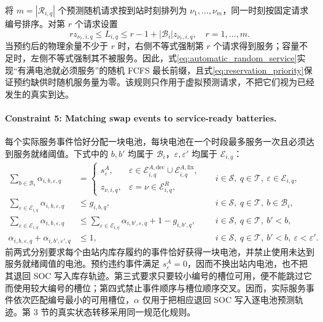 \documentclass[12pt,a4paper,UTF8]{ctexart}
\begin{document}
将 $m=|\mathcal R_{i,q}|$ 个预测随机请求按到站时刻排列为 $\nu_1,\ldots,\nu_m$，同一时刻按固定请求编号排序。对第 $r$ 个请求设置
\begin{equation}
rz_{\nu_r,i,q}
\le L_{i,q}
\le r-1+|\mathcal B_i|z_{\nu_r,i,q},
\quad r=1,\ldots,m.
\label{eq:automatic_random_service}
\end{equation}
当预约后的物理余量不少于 $r$ 时，右侧不等式强制第 $r$ 个请求得到服务；容量不足时，左侧不等式强制其不被服务。因此，式\eqref{eq:automatic_random_service}实现“有满电池就必须服务”的随机 FCFS 最长前缀，且式\eqref{eq:reservation_priority}保证预约缺供时随机服务量为零。该规则只作用于虚拟预测请求，不把它们视为已经发生的真实到达。

\paragraph{Constraint 5: Matching swap events to service-ready batteries.}
每个实际服务事件恰好分配一块电池，每块电池在一个时段最多服务一次且必须达到服务就绪阈值。下式中的 $b,b'$ 均属于 $\mathcal B_i$，$\varepsilon,\varepsilon'$ 均属于 $\mathcal E_{i,q}$：
\begin{subequations}
\label{eq:battery_event_assignment}
\begin{align}
\sum_{b\in\mathcal B_i}\alpha_{i,b,\varepsilon,q}
&=
\begin{cases}
s_\varepsilon^A,
&\varepsilon\in\mathcal E_{i,q}^{A,\mathrm{dec}}\cup
\mathcal E_{i,q}^{A,\mathrm{fix}},\\
z_{\nu,i,q},
&\varepsilon=\nu\in\mathcal E_{i,q}^{R},
\end{cases}
&&i\in\mathcal S,\ q\in\mathcal T,\ \varepsilon\in\mathcal E_{i,q},\\
\sum_{\varepsilon\in\mathcal E_{i,q}}\alpha_{i,b,\varepsilon,q}
&\le g_{i,b,q},
&&i\in\mathcal S,\ q\in\mathcal T,\ b\in\mathcal B_i,\\
\sum_{\varepsilon\in\mathcal E_{i,q}}\alpha_{i,b,\varepsilon,q}
&\le
\sum_{\varepsilon\in\mathcal E_{i,q}}\alpha_{i,b',\varepsilon,q}
+1-g_{i,b',q},
&&i\in\mathcal S,\ q\in\mathcal T,\ b'<b,\\
\alpha_{i,b,\varepsilon,q}+\alpha_{i,b',\varepsilon',q}
&\le1,
&&i\in\mathcal S,\ q\in\mathcal T,\ b'<b,\
\varepsilon<\varepsilon'.
\end{align}
\end{subequations}
前两式分别要求每个由站内库存履约的事件恰好获得一块电池，并禁止使用未达到服务就绪阈值的电池。预约违约事件满足 $s_\varepsilon^A=0$，因而不换出站内电池，也不把其退回 SOC 写入库存轨迹。第三式要求只要较小编号的槽位可用，便不能跳过它而使用较大编号的槽位；第四式禁止事件顺序与槽位顺序交叉。因而，实际服务事件依次匹配编号最小的可用槽位，$\alpha$ 仅用于把相应退回 SOC 写入逐电池预测轨迹。第 3 节的真实状态转移采用同一规范化规则。
\end{document}
